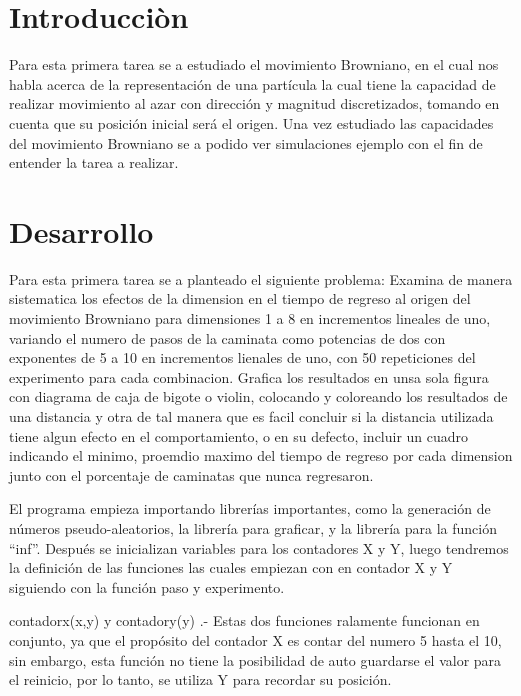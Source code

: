 \documentclass{article}
\begin{document}
\section{Introducciòn}\label{intro}


\newline

Para esta primera tarea se a estudiado el movimiento Browniano, en el cual nos habla acerca de la representación de una partícula la cual tiene la capacidad de realizar movimiento al azar con dirección y magnitud discretizados, tomando en cuenta que su posición inicial será el origen. Una vez estudiado las capacidades del movimiento Browniano se a podido ver simulaciones ejemplo con el fin de entender la tarea a realizar.

\section{Desarrollo}

Para esta primera tarea se a planteado el siguiente problema:
Examina de manera sistematica los efectos de la dimension en el tiempo de regreso al origen del movimiento Browniano para dimensiones 1 a 8 en incrementos lineales de uno, variando el numero de pasos de la caminata como potencias de dos con exponentes de 5 a 10 en incrementos lienales de uno, con 50 repeticiones del experimento para cada combinacion. Grafica los resultados en unsa sola figura con diagrama de caja de bigote o violin, colocando y coloreando los resultados de una distancia y otra de tal manera que es facil concluir si la distancia utilizada tiene algun efecto en el comportamiento, o en su defecto, incluir un cuadro indicando el minimo, proemdio maximo del tiempo de regreso por cada dimension junto con el porcentaje de caminatas que nunca regresaron.
\newline

El programa empieza importando librerías importantes, como la generación de números pseudo-aleatorios, la librería para graficar, y la librería para la función “inf”.   Después se inicializan variables para los contadores X y Y, luego tendremos la definición de las funciones las cuales empiezan con en contador X y Y siguiendo con la función paso y experimento.
\newline

contadorx(x,y) y contadory(y) .- Estas dos funciones ralamente funcionan en conjunto, ya que el propósito del contador X es contar del numero 5 hasta el 10, sin embargo, esta función no tiene la posibilidad de auto guardarse el valor para el reinicio, por lo tanto, se utiliza Y para recordar su posición.
\newline
\end{document}
